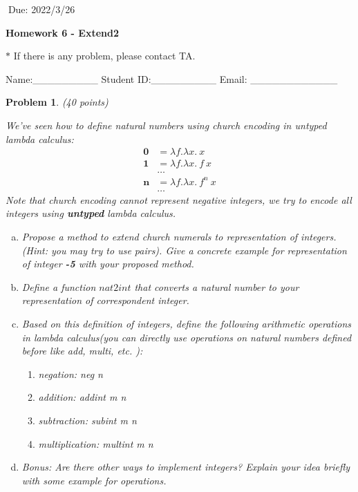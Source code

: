 \documentclass[12pt]{article}
\newtheorem{hw}{Problem}
\begin{document}
$\;$\hfill Due: 2022/3/26

\begin{center}
{\LARGE\bf Homework 6 - Extend2}
\end{center}

\begin{center}
	\footnotesize{\color{red}$*$ If there is any problem, please contact TA.}
	
	\footnotesize{\color{blue} \quad Name:\_\_\_\_\_\_\_\_\_  \quad Student ID:\_\_\_\_\_\_\_\_\_ \quad Email: \_\_\_\_\_\_\_\_\_\_\_\_}
\end{center}

\begin{hw}\rm (40 points)

	We've seen how to define natural numbers using church encoding in untyped lambda calculus:
	\begin{align*}
		\mathbf{0} &= \lambda f.\lambda x.\ x \\
		\mathbf{1} &= \lambda f.\lambda x.\ f\ x \\
		&\dots \\
		\mathbf{n} &= \lambda f.\lambda x.\ f^n\ x \\
		&\dots
	\end{align*}
	Note that church encoding cannot represent negative integers, we try to encode all integers using \textbf{untyped} lambda calculus.
	\begin{enumerate}[(a)]
	\item Propose a method to extend church numerals to representation of integers.(Hint: you may try to use pairs). Give a concrete example for representation of integer \textbf{-5} with your proposed method.
	
	\item Define a function $nat2int$ that converts a natural number to your representation of correspondent integer.
	
	\item Based on this definition of integers, define the following arithmetic operations in lambda calculus(you can directly use operations on natural numbers defined before like add, multi, etc. ): 
		\begin{enumerate}[(1)]
			\item negation: neg n
			\item addition: addint m n
			\item subtraction: subint m n
			\item multiplication: multint m n	
		\end{enumerate}
	\item Bonus: Are there other ways to implement integers? Explain your idea briefly with some example for operations.
	\end{enumerate}
\end{hw}
\end{document}
